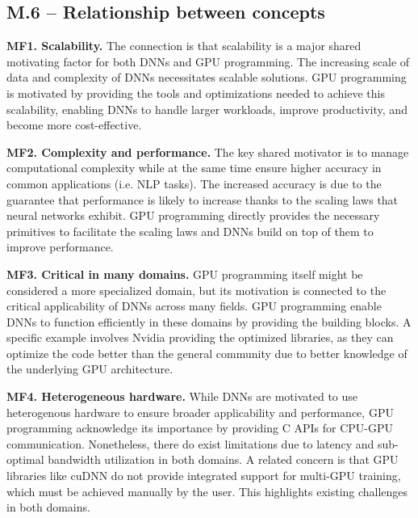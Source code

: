






\subsection{M.6 -- Relationship between concepts}

\textbf{MF1. Scalability.}
The connection is that scalability is a major shared motivating factor for both DNNs and GPU programming.
The increasing scale of data and complexity of DNNs necessitates scalable solutions. GPU programming is
motivated by providing the tools and optimizations needed to achieve this scalability, enabling DNNs to
handle larger workloads, improve productivity, and become more cost-effective.

\textbf{MF2. Complexity and performance.}
The key shared motivator is to manage computational complexity while at the same time ensure higher accuracy
in common applications (i.e. NLP tasks). The increased accuracy is due to the guarantee that performance
is likely to increase thanks to the scaling laws that neural networks exhibit.
GPU programming directly provides the necessary primitives to facilitate the scaling laws and DNNs build on 
top of them to improve performance.

\textbf{MF3. Critical in many domains.}
GPU programming itself might be considered a more specialized domain, but its motivation is connected to the
critical applicability of DNNs across many fields. GPU programming enable DNNs to function efficiently in
these domains by providing the building blocks. A specific example involves Nvidia providing the optimized libraries,
as they can optimize the code better than the general community due to better knowledge of the underlying GPU architecture.

\textbf{MF4. Heterogeneous hardware.}
While DNNs are motivated to use heterogenous hardware to ensure broader applicability and performance, GPU programming
acknowledge its importance by providing C APIs for CPU-GPU communication. Nonetheless, there do exist limitations
due to latency and sub-optimal bandwidth utilization in both domains. A related concern is that GPU libraries like cuDNN do not provide
integrated support for multi-GPU training, which must be achieved manually by the user. This highlights existing challenges
in both domains.

